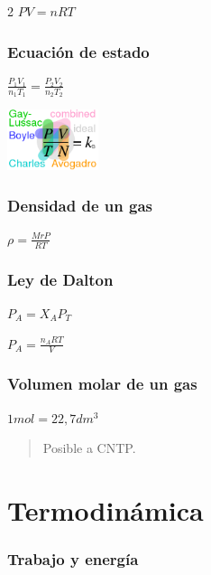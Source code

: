 \begin {multicols}{2}
\(PV=nRT\)

\hypertarget{ecuaciuxf3n-de-estado}{%
\subsubsection{Ecuación de estado}\label{ecuaciuxf3n-de-estado}}

\(\frac{P_{1}V_{1}}{n_{1}T_{1}}=\frac{P_{2}V_{2}}{n_{2}T_{2}}\)

\includegraphics[width=0.2\textwidth,height=\textheight]{./media/ideal-gas-law-relationships.png}

\hypertarget{densidad-de-un-gas}{%
\subsubsection{Densidad de un gas}\label{densidad-de-un-gas}}

\(\rho=\frac{MrP}{RT}\)

\hypertarget{ley-de-dalton}{%
\subsubsection{Ley de Dalton}\label{ley-de-dalton}}

\(P_{A}=X_{A}P_{T}\)

\(P_{A}=\frac{n_{A}RT}{V}\)

\hypertarget{volumen-molar-de-un-gas}{%
\subsubsection{Volumen molar de un gas}\label{volumen-molar-de-un-gas}}

\(1mol=22,7dm^{3}\)

\begin{quote}
Posible a CNTP.
\end{quote}

\hypertarget{termodinuxe1mica-1}{%
\section{Termodinámica}\label{termodinuxe1mica-1}}

\hypertarget{trabajo-y-energuxeda}{%
\subsubsection{Trabajo y energía}\label{trabajo-y-energuxeda}}


\end{multicols}
